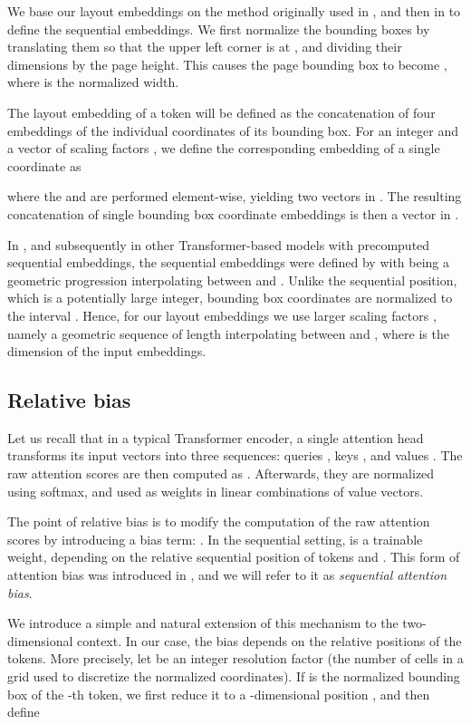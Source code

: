 We base our layout embeddings on the method originally used in
\citep{gehring2017convolutional}, and then in \citep{Vaswani2017-transformer} to
define the sequential embeddings. We first normalize the bounding boxes by
translating them so that the upper left corner is at , and dividing
their dimensions by the page height. This causes the page bounding box to become
, where  is the normalized width.

The layout embedding of a token will be defined as the concatenation of four
embeddings of the individual coordinates of its bounding box. For an integer
 and a vector of scaling factors , we define the
corresponding embedding of a single coordinate  as

where the  and  are performed element-wise, yielding two vectors
in . The resulting concatenation of single bounding box coordinate
embeddings is then a vector in .

In \citep[Section~3.5]{Vaswani2017-transformer}, and subsequently in other
Transformer-based models with precomputed sequential embeddings, the sequential
embeddings were defined by  with  being
a geometric progression interpolating between  and . Unlike the
sequential position, which is a potentially large integer, bounding box
coordinates are normalized to the interval . Hence, for our layout
embeddings we use larger scaling factors , namely a geometric
sequence of length  interpolating between  and , where 
is the dimension of the input embeddings.

\subsection{Relative bias}
\label{sec:relative-bias}


Let us recall that in a typical Transformer encoder, a single attention head
transforms its input vectors into three sequences: queries ,
keys , and values . The raw attention
scores are then computed as .
Afterwards, they are normalized using softmax, and used as weights in linear
combinations of value vectors.

The point of relative bias is to modify the computation of the raw attention
scores by introducing a bias term: .
In the sequential setting,  is a trainable weight,
depending on the relative sequential position of tokens  and . This
form of attention bias was introduced in \citep{Raffel2020}, and we will refer
to it as \emph{sequential attention bias}.

We introduce a simple and natural extension of this mechanism to the
two-dimensional context. In our case, the bias  depends on the
relative positions of the tokens. More precisely, let  be an integer
resolution factor (the number of cells in a grid used to discretize the
normalized coordinates). If  is the
normalized bounding box of the -th token, we first reduce it to a
-dimensional position ,
and then define

